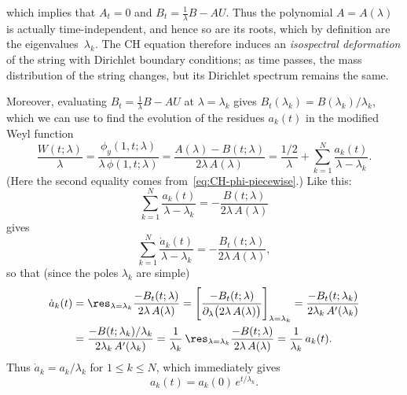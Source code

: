 \documentclass[10pt,a4paper]{article} \pdfoutput=1 
\begin{document}
which implies that $A_t = 0$ and $B_t = \tfrac{1}{\lambda} B - AU$.
Thus the polynomial $A = A(\lambda)$ is actually time-independent, and hence so are its roots,
which by definition are the eigenvalues~$\lambda_k$.
The CH equation therefore induces an \emph{isospectral deformation} of the string with Dirichlet
boundary conditions;
as time passes, the mass distribution of the string changes, but its Dirichlet spectrum remains the same.

Moreover, evaluating $B_t = \tfrac{1}{\lambda} B - AU$ at $\lambda=\lambda_k$ gives
$B_t(\lambda_k) = B(\lambda_k) / \lambda_k$,
which we can use to find the evolution of the residues $a_k(t)$ in
the modified Weyl function
\begin{equation*}
  \frac{W(t;\lambda)}{\lambda}
  = \frac{\phi_y(1,t;\lambda)}{\lambda \, \phi(1,t;\lambda)}
  = \frac{A(\lambda) - B(t;\lambda)}{2\lambda\,A(\lambda)}
  = \frac{1/2}{\lambda} + \sum_{k=1}^N \frac{a_k(t)}{\lambda-\lambda_k}
  .
\end{equation*}
(Here the second equality comes from~\eqref{eq:CH-phi-piecewise}.)
Like this:
\begin{equation*}
  \sum_{k=1}^N \frac{a_k(t)}{\lambda-\lambda_k} = - \frac{B(t;\lambda)}{2 \lambda \, A(\lambda)}
\end{equation*}
gives
\begin{equation*}
  \sum_{k=1}^N \frac{\dot a_k(t)}{\lambda-\lambda_k} = - \frac{B_t(t;\lambda)}{2 \lambda \, A(\lambda)}
  ,
\end{equation*}
so that (since the poles $\lambda_k$ are simple)
\begin{equation*}
  \begin{split}
    \dot a_k(t)
    &
    = \res_{\lambda=\lambda_k} \frac{- B_t(t;\lambda)}{2 \lambda \, A(\lambda)}
    = \left[ \frac{- B_t(t;\lambda)}{\partial_\lambda \bigl( 2 \lambda \, A(\lambda) \bigr)} \right]_{\lambda = \lambda_k}
    = \frac{- B_t(t;\lambda_k)}{2 \lambda_k \, A'(\lambda_k)}
    \\ &
    = \frac{- B(t;\lambda_k) / \lambda_k}{2 \lambda_k \, A'(\lambda_k)}
    = \frac{1}{\lambda_k} \, \res_{\lambda=\lambda_k} \frac{- B(t;\lambda)}{2 \lambda \, A(\lambda)}
    = \frac{1}{\lambda_k} \, a_k(t).
  \end{split}
\end{equation*}
Thus $\dot a_k = a_k/\lambda_k$ for $1 \le  k \le N$,
which immediately gives
\begin{equation}
  \label{eq:CH-a-of-t}
  a_k(t) = a_k(0) \, e^{t/\lambda_k}
  .
\end{equation}
\end{document}
